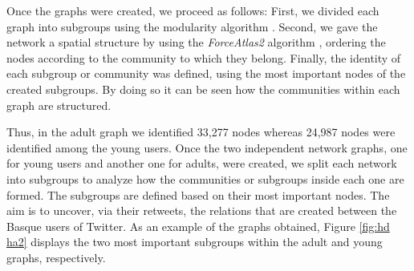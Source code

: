 \documentclass[information,article,submit,moreauthors,pdftex,10pt,a4paper]{Definitions/mdpi}
\begin{document}
Once the graphs were created, we proceed as follows: First, we divided each graph into subgroups using the modularity algorithm \cite{blondel2008fast}. Second, we gave the network a spatial structure by using the \textit{ForceAtlas2} algorithm \cite{jacomy2014forceatlas2}, ordering the nodes according to the community to which they belong. Finally, the identity of each subgroup or community was defined, using the most important nodes of the created subgroups. By doing so it can be seen how the communities within each graph are structured.

Thus, in the adult graph we identified 33,277 nodes whereas  24,987 nodes were identified among the young users. Once the two independent network graphs, one for young users and another one for adults, were created, we split each network into subgroups to analyze how the communities or subgroups inside each one are formed. The subgroups are defined based on their most important nodes. The aim is to uncover, via their retweets, the relations that are created between the Basque users of Twitter. As an example of the graphs obtained, Figure \ref{fig:hd ha2} displays the two most important subgroups within the adult and young graphs, respectively.
\end{document}
